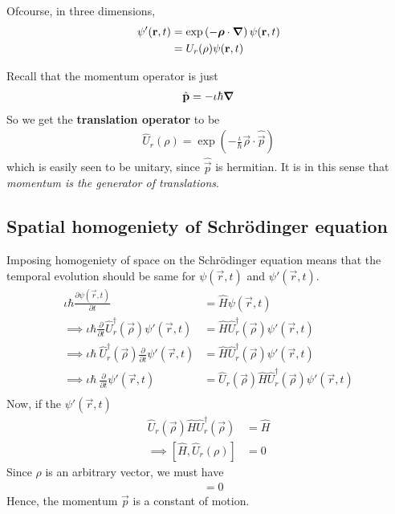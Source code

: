 Ofcourse, in three dimensions, 
\begin{align*}
    \psi'(\boldsymbol{\mathbf{r}},t) &= \exp \left(-\boldsymbol{\mathbf{\rho}} \cdot \boldsymbol{\mathbf{\nabla}} \right) \psi(\boldsymbol{\mathbf{r}},t)\\
        &= U_r(\rho) \psi(\boldsymbol{\mathbf{r}},t)
\end{align*}

Recall that the momentum operator is just
\begin{align*}
    \hat {\boldsymbol{\mathbf{p}}} = -\iota \hbar \boldsymbol{\mathbf{\nabla}}
\end{align*}
So we get the \textbf{translation operator} to be
\begin{align*}
    \hat U_r(\rho) = \exp{\left( -\frac{\iota}{\hbar} \vec \rho\cdot \hat {\vec p} \right)}
\end{align*}
which is easily seen to be unitary, since $\hat{\vec p}$ is hermitian. It is in this sense that \emph{momentum is the generator of translations}.

\subsection{Spatial homogeniety of Schr\"odinger equation}
\label{sub:spatial_homogeniety_of_schr"odinger_equation}

Imposing homogeniety of space on the Schr\"odinger equation means that the temporal evolution should be same for $\psi(\vec r,t)$ and $\psi'(\vec r,t)$. 
\begin{align*}
    \iota \hbar \frac{\partial \psi(\vec r,t)}{\partial t} &= \hat H \psi(\vec r,t) \\
    \implies 
    \iota \hbar \frac{\partial }{\partial t}\hat U_r^\dagger(\vec \rho) \psi'(\vec r,t) &= \hat H \hat U_r^\dagger(\vec \rho) \psi'(\vec r,t) \\
    \implies 
    \iota \hbar\ \hat U_r^\dagger(\vec \rho)\frac{\partial }{\partial t} \psi'(\vec r,t) &= \hat H \hat U_r^\dagger(\vec \rho) \psi'(\vec r,t) \\
    \implies 
    \iota \hbar\ \frac{\partial }{\partial t} \psi'(\vec r,t) &= \hat U_r(\vec \rho)\hat H \hat U_r^\dagger(\vec \rho) \psi'(\vec r,t) \\
\end{align*}
Now, if the $\psi'(\vec r,t)$ 
\begin{align*}
    \hat U_r(\vec \rho)\hat H \hat U_r^\dagger(\vec \rho) &= \hat H\\
    \implies [\hat H, \hat U_r(\rho)] &=0
\end{align*}
Since $\rho$ is an arbitrary vector, we must have 
\begin{align*}
    [\hat H, \hat {\vec p}] &=0
\end{align*}
Hence, the momentum $\vec p$ is a constant of motion.




